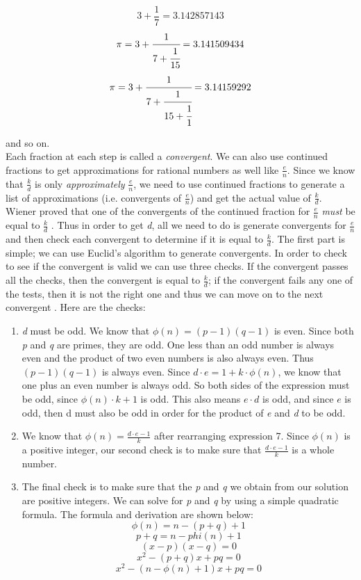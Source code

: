 \documentclass[11pt]{article}
\begin{document}
$$ 3 + \frac{1}{7} = 3.142857143$$
$$\pi=3+\cfrac{1}{7+\cfrac{1}{15}} = 3.141509434$$
$$\pi=3+\cfrac{1}{7+\cfrac{1}{15+\cfrac{1}{1}}} = 3.14159292 $$

and so on. \\

Each fraction at each step is called a \emph{convergent}. We can also use continued fractions to get approximations for rational numbers as well like $\frac{e}{n}$. Since we know that $\frac{k}{d}$ is only \emph{approximately} $\frac{e}{n}$, we need to use continued fractions to generate a list of approximations (i.e. convergents of $\frac{e}{n}$) and get the actual value of $\frac{k}{d}$. Wiener proved that one of the convergents of the continued fraction for $\frac{e}{n}$ \emph{must} be equal to $\frac{k}{d}$ \cite{boneh}. Thus in order to get \emph{d}, all we need to do is generate convergents for $\frac{e}{n}$ and then check each convergent to determine if it is equal to $\frac{k}{d}$. The first part is simple; we can use Euclid's algorithm to generate convergents. In order to check to see if the convergent is valid we can use three checks. If the convergent passes all the checks, then the convergent is equal to $\frac{k}{d}$; if the convergent fails any one of the tests, then it is not the right one and thus we can move on to the next convergent \cite{wieners-youtube}. Here are the checks:

\begin{enumerate}
	\item \emph{d} must be odd. We know that $\phi(n) = (p - 1)(q - 1)$ is even. Since both \emph{p} and \emph{q} are primes, they are odd. One less than an odd number is always even and the product of two even numbers is also always even. Thus $(p - 1)(q - 1)$ is always even. Since $d \cdot e = 1 + k \cdot \phi(n) $, we know that one plus an even number is always odd. So both sides of the expression must be odd, since $\phi(n) \cdot k + 1$ is odd. This also means $e \cdot d$ is odd, and since $e$ is odd, then d must also be odd in order for the product of \emph{e} and \emph{d} to be odd. 
	\item We know that $\phi(n) = \frac{d \cdot e  - 1}{k}$ after rearranging expression 7. Since $\phi(n)$ is a positive integer, our second check is to make sure that $\frac{d \cdot e  - 1}{k}$ is a whole number.
	\item The final check is to make sure that the \emph{p} and \emph{q} we obtain from our solution are positive integers. We can solve for \emph{p} and \emph{q} by using a simple quadratic formula. The formula and derivation are shown below:
		$$ \phi(n) = n - (p + q) + 1$$
		$$ p + q = n - phi(n) + 1$$
		$$ (x - p)(x - q) = 0$$
		$$ x^2 - (p + q)x + pq = 0$$
		$$ x^2 - (n - \phi(n) + 1)x + pq = 0$$
\end{enumerate}
\end{document}

